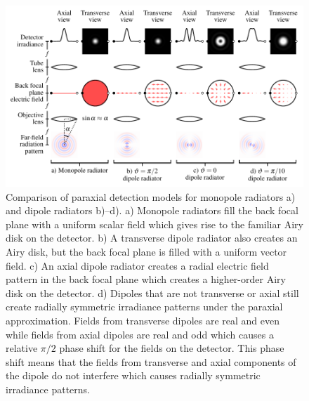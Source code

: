 \documentclass{osa-article}
\begin{document}
\begin{figure}[h]
 \centering
   \centering
   \includegraphics[scale=0.8]{../figures/microscope/microscope.pdf}
   \caption{Comparison of paraxial detection models for monopole radiators a)
     and dipole radiators b)--d). a) Monopole radiators fill the back focal
     plane with a uniform scalar field which gives rise to the familiar Airy
     disk on the detector. b) A transverse dipole radiator also creates an Airy
     disk, but the back focal plane is filled with a uniform vector field. c) An
     axial dipole radiator creates a radial electric field pattern in the back
     focal plane which creates a higher-order Airy disk on the detector. d)
     Dipoles that are not transverse or axial still create radially symmetric
     irradiance patterns under the paraxial approximation. Fields from
     transverse dipoles are real and even while fields from axial dipoles are
     real and odd which causes a relative $\pi/2$ phase shift for the fields on
     the detector. This phase shift means that the fields from transverse and
     axial components of the dipole do not interfere which causes radially
     symmetric irradiance patterns.}
   \label{fig:microscope}
 \end{figure}
\end{document}
